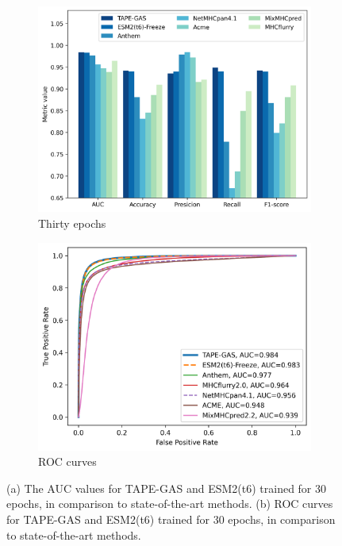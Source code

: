 \begin{figure}[h]
	\begin{subfigure}[b]{0.45\textwidth}
		\centering
		\includegraphics[width=\textwidth]{../img/results/metrics_comparison}
		\caption{Thirty epochs}
		\label{fig:comparison_final}
	\end{subfigure}
	\hfill
	\begin{subfigure}[b]{0.45\textwidth}
		\centering
		\includegraphics[width=\textwidth]{../img/results/ROC_comparison}
		\caption{ROC curves}
		\label{fig:ROC_comparison_final}
	\end{subfigure}
	
	
	\caption{(a) The AUC values for TAPE-GAS and ESM2(t6) trained for 30 epochs, in comparison to state-of-the-art methods. (b) ROC curves for TAPE-GAS and ESM2(t6) trained for 30 epochs, in comparison to state-of-the-art methods.}
	\label{fig:comparison}
\end{figure}





